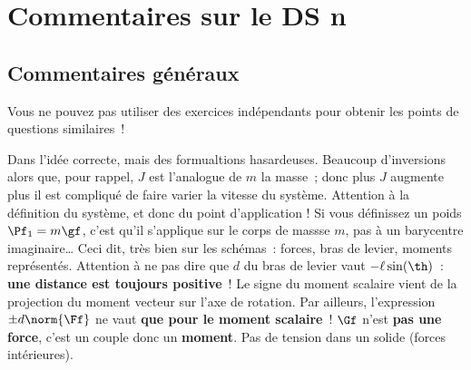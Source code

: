 \documentclass[a4paper, 10pt, final, garamond]{book}
\begin{document}
\setcounter{chapter}{6}

\chapter{Commentaires sur le DS n}

\section{Commentaires généraux}

Vous ne pouvez pas utiliser des exercices indépendants pour obtenir les points
de questions similaires~!


\setcounter{section}{0}
\begin{enumerate}
	Dans l'idée correcte, mais des formualtions hasardeuses. Beaucoup d'inversions
	alors que, pour rappel, $J$ est l'analogue de $m$ la masse~; donc plus $J$
	augmente plus il est compliqué de faire varier la vitesse du système.
	Attention à la définition du système, et donc du point d'application ! Si vous
	définissez un poids $\Pf_1 = m\gf$, c'est qu'il s'applique sur le corps de
	massse $m$, pas à un barycentre imaginaire…
	\smallbreak
	Ceci dit, très bien sur les schémas~: forces, bras de levier, moments
	représentés.
	\smallbreak
	Attention à ne pas dire que $d$ du bras de levier vaut $- \ell\sin(\th)$~:
	\textbf{une distance est toujours positive}~! Le signe du moment scalaire
	vient de la projection du moment vecteur sur l'axe de rotation.
	\smallbreak
	Par ailleurs, l'expression $\pm d \norm{\Ff}$ ne vaut \textbf{que pour le
		moment scalaire}~!
	\bigbreak
	$\Gf$ n'est \textbf{pas une force}, c'est un couple donc un \textbf{moment}.
	\smallbreak
	Pas de tension dans un solide (forces intérieures).
\end{enumerate}
\end{document}
